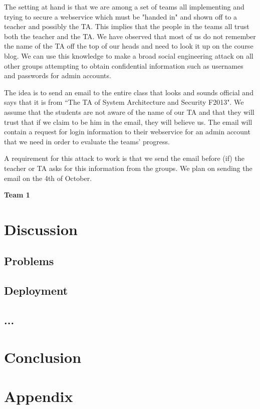 \documentclass[a4paper]{article}
\begin{document}
The setting at hand is that we are among a set of teams all implementing and trying to secure a webservice which must be "handed in" and shown off to a teacher and possibly the TA. This implies that the people in the teams all trust both the teacher and the TA. We have observed that most of us do not remember the name of the TA off the top of our heads and need to look it up on the course blog.
We can use this knowledge to make a broad social engineering attack on all other groups attempting to obtain confidential information such as usernames and passwords for admin accounts.

The idea is to send an email to the entire class that looks and sounds official and says that it is from ``The TA of System Architecture and Security F2013". We assume that the students are not aware of the name of our TA and that they will trust that if we claim to be him in the email, they will believe us. The email will contain a request for login information to their webservice for an admin account that we need in order to evaluate the teams' progress.

A requirement for this attack to work is that we send the email before (if) the teacher or TA asks for this information from the groups. We plan on sending the email on the 4th of October.


\textbf{Team 1}



\section{Discussion}
\subsection{Problems}
\subsection{Deployment}

\subsection{...}


\section{Conclusion}

\section{Appendix}

\end{document}
